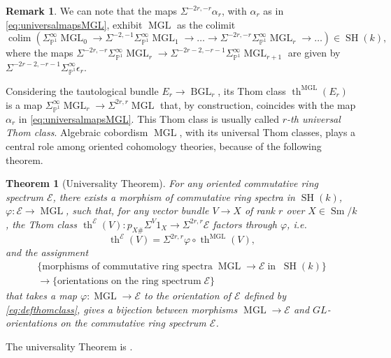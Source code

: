 \documentclass[10pt]{amsart}
\theoremstyle{definition}
\newtheorem{rmk}[defn]{Remark}
\theoremstyle{plain}
\newtheorem{thm}[defn]{Theorem}
\numberwithin{equation}{section}
\newcommand{\0}{\emptyset}
\newcommand{\sE}{{\mathcal E}}
\renewcommand{\P}{{\mathbb P}}
\newcommand{\MGL}{{\operatorname{MGL}}}
\newcommand{\BGL}{{\operatorname{BGL}}}
\newcommand{\SH}{{\operatorname{SH}}}
\newcommand{\Sm}{{\operatorname{Sm}}}
\renewcommand{\th}{{\operatorname{th}}}
\newcommand{\colim}{{\operatorname*{colim}}}
\begin{document}
\begin{rmk}
\label{rmk:MGLcolim}
    We can note that the maps $\Sigma^{-2r,-r}\alpha_r$, with $\alpha_r$ as in \eqref{eq:universalmapsMGL}, exhibit $\MGL$ as the colimit
    $$\colim(\Sigma_{\P^1}^\infty \MGL_0 \to \Sigma^{-2,-1}\Sigma_{\P^1}^\infty \MGL_1 \to \ldots \to \Sigma^{-2r,-r}\Sigma_{\P^1}^\infty \MGL_r \to \ldots) \in \SH(k),$$
    where the maps $\Sigma^{-2r,-r}\Sigma_{\P^1}^\infty \MGL_r \to \Sigma^{-2r-2,-r-1}\Sigma_{\P^1}^\infty \MGL_{r+1}$ are given by $\Sigma^{-2r-2,-r-1}\Sigma^\infty_{\P^1}\epsilon_r$.
\end{rmk}

Considering the tautological bundle $E_r \to \BGL_r$, its Thom class $\th^\MGL(E_r)$ is a map $\Sigma_{\P^1}^\infty \MGL_r \to \Sigma^{2r,r}\MGL$ that, by construction, coincides with the map $\alpha_r$ in \eqref{eq:universalmapsMGL}. This Thom class is usually called \emph{$r$-th universal Thom class}. Algebraic cobordism $\MGL$, with its universal Thom classes, plays a central role among oriented cohomology theories, because of the following theorem.

\begin{thm}[Universality Theorem]
    For any oriented commutative ring spectrum $\sE$, there exists a morphism of commutative ring spectra in $\SH(k)$, $\varphi:\sE \to \MGL$, such that, for any vector bundle $V\to X$ of rank $r$ over $X \in \Sm/k$, the Thom class $\th^\sE(V):p_{X\#}\Sigma^V1_X \to \Sigma^{2r,r}\sE$ factors through $\varphi$, i.e. 
    \begin{equation}
    \label{eq:defthomclass}
        \th^\sE(V)= \Sigma^{2r,r}\varphi \circ \th^\MGL(V),
    \end{equation}
    and the assignment
    \begin{multline*}
        \{\text{morphisms of commutative ring spectra} \;  \MGL \to \sE \; \text{in} \; \; \SH(k)\} \\ \to \{\text{orientations on the ring spectrum} \; \sE\}
    \end{multline*}
    that takes a map $\varphi: \MGL \to \sE$ to the orientation of $\sE$ defined by \eqref{eq:defthomclass}, gives a bijection between morphisms $\MGL \to \sE$ and $GL$-orientations on the commutative ring spectrum $\sE$. 
\end{thm}

The universality Theorem is \cite[Theorem 2.7]{Panin:algcob}.
\end{document}
